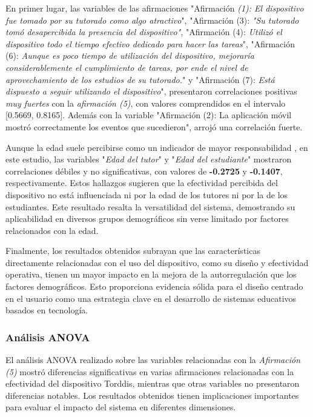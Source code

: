 \documentclass[a4paper,fleqn]{cas-sc}
\begin{document}
					En primer lugar, las variables de las afirmaciones "Afirmación \textit{(1): El dispositivo fue tomado por su tutorado como algo atractivo}", "Afirmación (3): \textit{"Su tutorado tomó desapercibida la presencia del dispositivo"}, "Afirmación (4): \textit{Utilizó el dispositivo todo el tiempo efectivo dedicado para hacer las tareas}", "Afirmación (6): \textit{Aunque es poco tiempo de utilización del dispositivo, mejoraría considerablemente el cumplimiento de tareas, por ende el nivel de aprovechamiento de los estudios de su tutorado.}" y "Afirmación (7): \textit{Está dispuesto a seguir utilizando el dispositivo}", presentaron correlaciones positivas \textit{muy fuertes} con la \textit{afirmación (5)}, con valores comprendidos en el intervalo [0.5669, 0.8165]. Además con la variable "Afirmación (2): La aplicación móvil mostró correctamente los eventos que sucedieron", arrojó una correlación fuerte.
						
					Aunque la edad suele percibirse como un indicador de mayor responsabilidad \citep{Moss2018Why}, en este estudio, las variables "\textit{Edad del tutor}" y "\textit{Edad del estudiante}" mostraron correlaciones débiles y no significativas, con valores de \textbf{-0.2725} y \textbf{-0.1407}, respectivamente. Estos hallazgos sugieren que la efectividad percibida del dispositivo no está influenciada ni por la edad de los tutores ni por la de los estudiantes. Este resultado resalta la versatilidad del sistema, demostrando su aplicabilidad en diversos grupos demográficos sin verse limitado por factores relacionados con la edad.
						
					Finalmente, los resultados obtenidos subrayan que las características directamente relacionadas con el uso del dispositivo, como su diseño y efectividad operativa, tienen un mayor impacto en la mejora de la autorregulación que los factores demográficos. Esto proporciona evidencia sólida para el diseño centrado en el usuario como una estrategia clave en el desarrollo de sistemas educativos basados en tecnología.
						
				\subsubsection{Análisis ANOVA}
					El análisis ANOVA realizado sobre las variables relacionadas con la \textit{Afirmación (5)} mostró diferencias significativas en varias afirmaciones relacionadas con la efectividad del dispositivo Torddis, mientras que otras variables no presentaron diferencias notables. Los resultados obtenidos tienen implicaciones importantes para evaluar el impacto del sistema en diferentes dimensiones.
						
\end{document}
